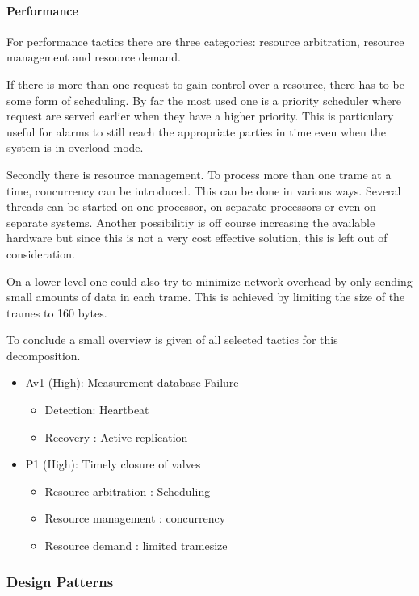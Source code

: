 \paragraph{Performance} 

\npar For performance tactics there are three categories: resource
arbitration, resource management and resource demand.

\npar If there is more than one request to gain control over a resource, there
has to be some form of scheduling. By far the most used one is a priority
scheduler where request are served earlier when they have a higher priority.
This is particulary useful for alarms to still reach the appropriate parties in
time even when the system is in overload mode. 

\npar Secondly there is resource management. To process more than one trame at a
time, concurrency can be introduced. This can be done in various ways. Several
threads can be started on one processor, on separate processors or even on
separate systems. Another possibilitiy is off course increasing the available
hardware but since this is not a very cost effective solution, this is left out
of consideration.

\npar On a lower level one could also try to minimize network overhead by
only sending small amounts of data in each trame. This is achieved by
limiting the size of the trames to 160 bytes.

\npar To conclude a small overview is given of all selected tactics for this
decomposition.

\begin{itemize}
 	\item Av1 (High): Measurement database Failure
 	\begin{itemize}
 		\item Detection: Heartbeat 
 		\item Recovery : Active replication
 	\end{itemize}
  	\item P1 (High): Timely closure of valves
  	\begin{itemize}
  		\item Resource arbitration : Scheduling
		\item Resource management  : concurrency
		\item Resource demand      : limited tramesize
  	\end{itemize}
\end{itemize}

\subsubsection{Design Patterns}
\label{dp:whole-system} %

